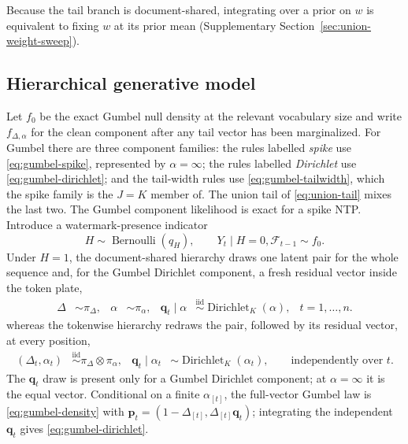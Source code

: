 \documentclass[11pt]{article}
\newcommand{\F}{\mathcal F}
\newcommand{\bP}{\bm p}
\begin{document}
Because the tail branch is document-shared, integrating over a prior on $w$ is equivalent to fixing $w$ at its prior mean (Supplementary Section~\ref{sec:union-weight-sweep}).

\subsection{Hierarchical generative model}
\label{sec:hierarchy}

Let $f_0$ be the exact Gumbel null density at the relevant vocabulary size and write $f_{\Delta,\alpha}$ for the clean component after any tail vector has been marginalized.  For Gumbel there are three component families: the rules labelled \emph{spike} use \eqref{eq:gumbel-spike}, represented by $\alpha=\infty$; the rules labelled \emph{Dirichlet} use \eqref{eq:gumbel-dirichlet}; and the tail-width rules use \eqref{eq:gumbel-tailwidth}, which the spike family is the $J=K$ member of.  The union tail of \eqref{eq:union-tail} mixes the last two.  The Gumbel component likelihood is exact for a spike NTP.  Introduce a watermark-presence indicator
\begin{equation}
  H\sim\operatorname{Bernoulli}(q_H),
  \qquad
  Y_t\mid H=0,\F_{t-1}\sim f_0.
  \label{eq:hier-null}
\end{equation}
Under $H=1$, the document-shared hierarchy draws one latent pair for the whole sequence and, for the Gumbel Dirichlet component, a fresh residual vector inside the token plate,
\begin{equation}
  \begin{aligned}
    \Delta&\sim\pi_\Delta, &
    \alpha&\sim\pi_\alpha, &
    \bm q_t\mid\alpha&\stackrel{\mathrm{iid}}{\sim}
      \operatorname{Dirichlet}_K(\alpha),
    &t=1,\ldots,n.
  \end{aligned}
  \label{eq:hier-shared}
\end{equation}
whereas the tokenwise hierarchy redraws the pair, followed by its residual vector, at every position,
\begin{equation}
  \begin{aligned}
    (\Delta_t,\alpha_t)&\stackrel{\mathrm{iid}}{\sim}
      \pi_\Delta\otimes\pi_\alpha,
    & \bm q_t\mid\alpha_t&\sim\operatorname{Dirichlet}_K(\alpha_t),
    \qquad\text{independently over }t.
  \end{aligned}
  \label{eq:hier-tokenwise}
\end{equation}
The $\bm q_t$ draw is present only for a Gumbel Dirichlet component; at $\alpha=\infty$ it is the equal vector.  Conditional on a finite $\alpha_{[t]}$, the full-vector Gumbel law is \eqref{eq:gumbel-density} with $\bP_t=(1-\Delta_{[t]},\Delta_{[t]}\bm q_t)$; integrating the independent $\bm q_t$ gives \eqref{eq:gumbel-dirichlet}.
\end{document}
